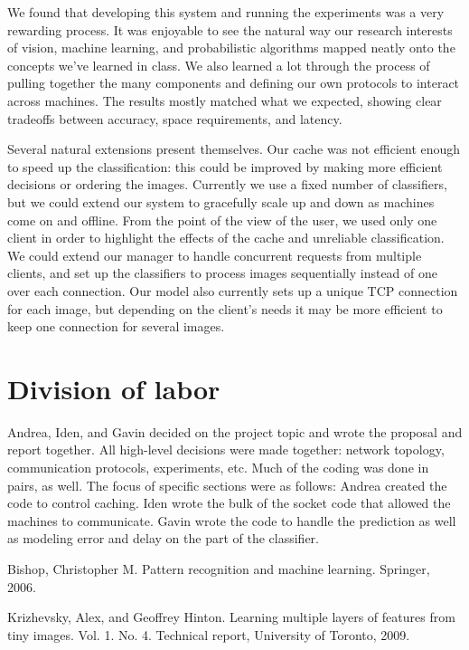\documentclass[11pt]{article}
\begin{document}
We found that developing this system and running the experiments was a very rewarding process.
It was enjoyable to see the natural way our research interests of vision, machine learning, and probabilistic algorithms mapped neatly onto the concepts we've learned in class.
We also learned a lot through the process of pulling together the many components and defining our own protocols to interact across machines.
The results mostly matched what we expected, showing clear tradeoffs between accuracy, space requirements, and latency.

Several natural extensions present themselves.
Our cache was not efficient enough to speed up the classification: this could be improved by making more efficient decisions or ordering the images.
Currently we use a fixed number of classifiers, but we could extend our system to gracefully scale up and down as machines come on and offline.
From the point of the view of the user, we used only one client in order to highlight the effects of the cache and unreliable classification.
We could extend our manager to handle concurrent requests from multiple clients, and set up the classifiers to process images sequentially instead of one over each connection.
Our model also currently sets up a unique TCP connection for each image, but depending on the client's needs it may be more efficient to keep one connection for several images.

\section{Division of labor}

Andrea, Iden, and Gavin decided on the project topic and wrote the proposal and report together.
All high-level decisions were made together: network topology, communication protocols, experiments, etc.
Much of the coding was done in pairs, as well.
The focus of specific sections were as follows: Andrea created the code to control caching.
Iden wrote the bulk of the socket code that allowed the machines to communicate.
Gavin wrote the code to handle the prediction as well as modeling error and delay on the part of the classifier.


\footnotesize\begin{thebibliography}{1}
    Bishop, Christopher M. Pattern recognition and machine learning. Springer, 2006.

    Krizhevsky, Alex, and Geoffrey Hinton. Learning multiple layers of features from tiny images. Vol. 1. No. 4. Technical report, University of Toronto, 2009.

\end{thebibliography}
\end{document}
